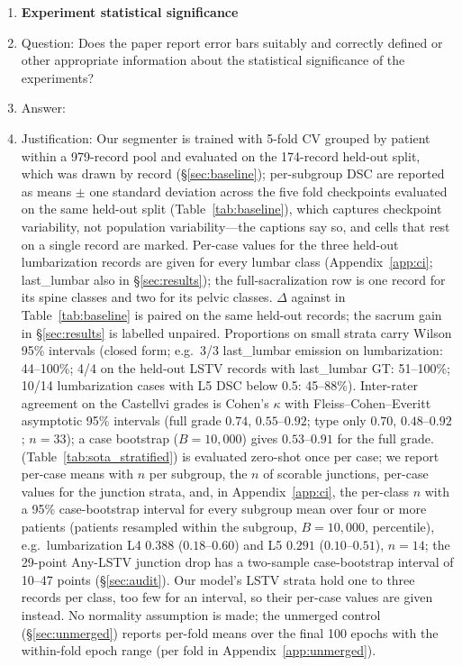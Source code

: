 \begin{enumerate}
\item {\bf Experiment statistical significance}
    \item[] Question: Does the paper report error bars suitably and correctly defined or other appropriate information about the statistical significance of the experiments?
    \item[] Answer: \answerYes{}
    \item[] Justification: Our segmenter is trained with 5-fold CV grouped by patient within a 979-record pool and evaluated on the 174-record held-out split, which was drawn by record (\S\ref{sec:baseline}); per-subgroup DSC are reported as means $\pm$ one standard deviation across the five fold checkpoints evaluated on the same held-out split (Table~\ref{tab:baseline}), which captures checkpoint variability, not population variability---the captions say so, and cells that rest on a single record are marked. Per-case values for the three held-out lumbarization records are given for every lumbar class (Appendix~\ref{app:ci}; last\_lumbar also in \S\ref{sec:results}); the full-sacralization row is one record for its spine classes and two for its pelvic classes. $\Delta$ against \sota{} in Table~\ref{tab:baseline} is paired on the same held-out records; the sacrum gain in \S\ref{sec:results} is labelled unpaired. Proportions on small strata carry Wilson 95\% intervals (closed form; e.g.\ 3/3 last\_lumbar emission on lumbarization: 44--100\%; 4/4 on the held-out LSTV records with last\_lumbar GT: 51--100\%; 10/14 lumbarization cases with \sota{} L5 DSC below 0.5: 45--88\%). Inter-rater agreement on the Castellvi grades is Cohen's $\kappa$ with Fleiss--Cohen--Everitt asymptotic 95\% intervals (full grade $0.74$, $0.55$--$0.92$; type only $0.70$, $0.48$--$0.92$; $n{=}33$); a case bootstrap ($B{=}10{,}000$) gives $0.53$--$0.91$ for the full grade. \sota{} (Table~\ref{tab:sota_stratified}) is evaluated zero-shot once per case; we report per-case means with $n$ per subgroup, the $n$ of scorable junctions, per-case values for the junction strata, and, in Appendix~\ref{app:ci}, the per-class $n$ with a 95\% case-bootstrap interval for every subgroup mean over four or more patients (patients resampled within the subgroup, $B{=}10{,}000$, percentile), e.g.\ lumbarization L4 $0.388$ ($0.18$--$0.60$) and L5 $0.291$ ($0.10$--$0.51$), $n{=}14$; the 29-point Any-LSTV junction drop has a two-sample case-bootstrap interval of 10--47 points (\S\ref{sec:audit}). Our model's LSTV strata hold one to three records per class, too few for an interval, so their per-case values are given instead. No normality assumption is made; the unmerged control (\S\ref{sec:unmerged}) reports per-fold means over the final 100 epochs with the within-fold epoch range (per fold in Appendix~\ref{app:unmerged}).

\end{enumerate}
